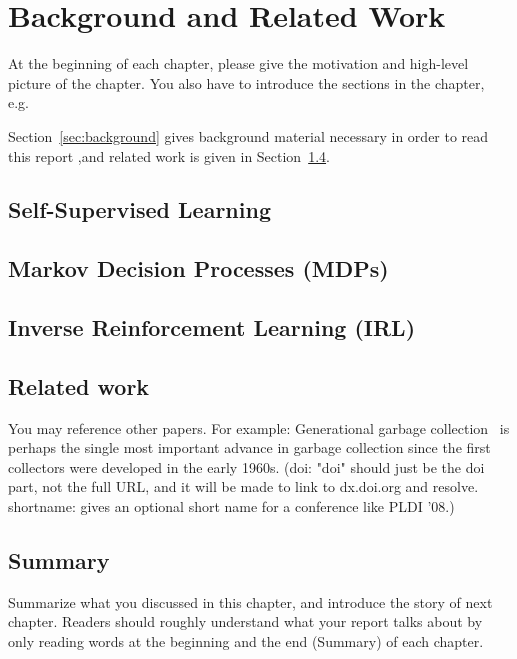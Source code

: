 \chapter{Background and Related Work}
\label{cha:background}

At the beginning of each chapter, please give the motivation and
high-level picture of the chapter. You also have to introduce the sections
in the chapter, e.g.\

  Section~\ref{sec:background} gives background material necessary in
  order to read this report ,and related work is given in
  Section~\ref{sec:relatedwork}.\\


\section{Self-Supervised Learning}
\label{sec:mdps}
  
\section{Markov Decision Processes (MDPs)}
\label{sec:mdps}

\section{Inverse Reinforcement Learning (IRL)}
\label{sec:irl}


\section{Related work}
\label{sec:relatedwork}
You may reference other papers. For example: Generational garbage
collection~\citep{LH:83,Moon:84,Ungar:84} is perhaps the single most
important advance in garbage collection since the first collectors
were developed in the early 1960s. (doi: "doi" should just be the doi
part, not the full URL, and it will be made to link to dx.doi.org and
resolve.  shortname: gives an optional short name for a conference
like PLDI '08.)


\section{Summary}

Summarize what you discussed in this chapter, and introduce the story
of next chapter. Readers should roughly understand what your report
talks about by only reading words at the beginning and the end
(Summary) of each chapter.


